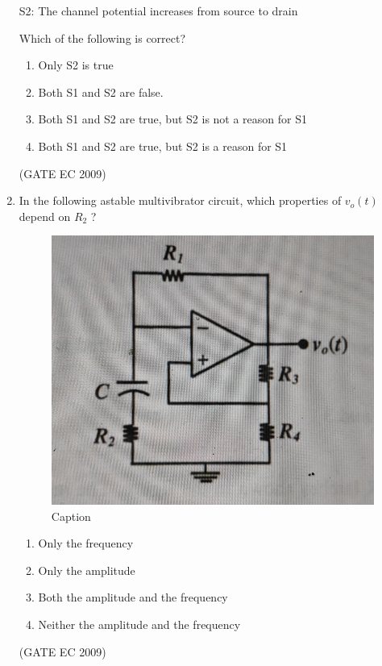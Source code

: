 \documentclass[journal,12pt,onecolumn]{IEEEtran}
\theoremstyle{remark}
\begin{document}
\begin{enumerate}[start=1, label={Q\arabic*.}]
\begin{center}
    S2: The channel potential increases from source to drain
\end{center}Which of the following is correct?
\begin{enumerate}[label=(\Alph*)]
        \item Only S2 is true
        \item Both S1 and S2 are false.
        \item Both S1 and S2 are true, but S2 is not a reason for S1
        \item Both S1 and S2 are true, but S2 is a reason for S1
\end{enumerate}
\hfill (GATE EC 2009)

\item In the following astable multivibrator circuit, which properties of $v_o(t)$ depend on $R_2$ ?
\begin{figure}[H]
    \centering
    \includegraphics[width=0.5\linewidth]{images/img_13.jpg}
    \caption{Caption}
    \label{fig:placeholder}
\end{figure}
\begin{enumerate}[label=(\Alph*)]
        \item Only the frequency 
        \item Only the amplitude
        \item Both the amplitude and the frequency 
        \item Neither the amplitude and the frequency 
\end{enumerate}
\hfill (GATE EC 2009)


\end{enumerate}
\end{document}
